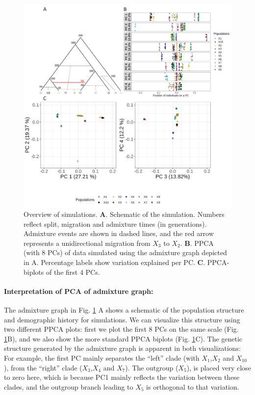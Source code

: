 \documentclass[12pt]{article}
\begin{document}
\begin{figure}[ht!]
    \includegraphics[width=16.5cm]{Images/ppca/Figures/sim_final.png}
    \centering
    \caption{Overview of simulations. \textbf{A}. Schematic of the simulation. Numbers reflect split, migration and admixture times (in generations). Admixture events are shown in dashed lines, and the red arrow represents a unidirectional migration from $X_3$ to $X_2$. \textbf{B}. PPCA (with 8 PCs) of data simulated using the admixture graph depicted in A. Percentage labels show variation explained per PC. \textbf{C}. PPCA-biplots of the first 4 PCs.
}
    \label{fig2:sim}
\end{figure}


\paragraph{Interpretation of PCA of admixture graph:}
The admixture graph in Fig. \ref{fig2:sim} A shows a schematic of the population structure and demographic history for simulations. We can visualize this structure using two different PPCA plots: first we plot the first 8 PCs on the same scale (Fig. \ref{fig2:sim}B), and we also show the more standard PPCA biplots (Fig. \ref{fig2:sim}C). The genetic structure generated by the admixture graph is apparent in both visualizations: For example, the first PC mainly separates  the ``left'' clade (with $X_1$,$X_2$ and $X_{10}$), from the ``right'' clade ($X_3$,$X_4$ and $X_7$). The outgroup ($X_5$), is placed very close to zero here, which is because PC1 mainly reflects the variation between these clades, and the outgroup branch leading to $X_5$ is orthogonal to that variation. 
\end{document}
